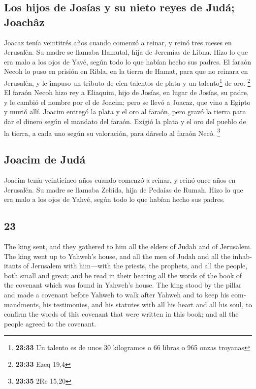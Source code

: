 \begin{paracol}{2}
\hypertarget{los-hijos-de-josuxedas-y-su-nieto-reyes-de-juduxe1-joachuxe2z}{%
\subsection{Los hijos de Josías y su nieto reyes de Judá;
Joachâz}\label{los-hijos-de-josuxedas-y-su-nieto-reyes-de-juduxe1-joachuxe2z}}

 Joacaz tenía veintitrés años cuando comenzó a reinar, y
reinó tres meses en Jerusalén. Su madre se llamaba Hamutal, hija de
Jeremías de Libna.  Hizo lo que era malo a los ojos de
Yavé, según todo lo que habían hecho sus padres.  El
faraón Necoh lo puso en prisión en Ribla, en la tierra de Hamat, para
que no reinara en Jerusalén, y le impuso un tributo de cien talentos de
plata y un talento\footnote{\textbf{23:33} Un talento es de unos 30
  kilogramos o 66 libras o 965 onzas troyanas} de oro. \footnote{\textbf{23:33}
  Ezeq 19,4}  El faraón Necoh hizo rey a Eliaquim, hijo
de Josías, en lugar de Josías, su padre, y le cambió el nombre por el de
Joacim; pero se llevó a Joacaz, que vino a Egipto y murió allí.
 Joacim entregó la plata y el oro al faraón, pero gravó
la tierra para dar el dinero según el mandato del faraón. Exigió la
plata y el oro del pueblo de la tierra, a cada uno según su valoración,
para dárselo al faraón Necó. \footnote{\textbf{23:35} 2Re 15,20}

\hypertarget{joacim-de-juduxe1}{%
\subsection{Joacim de Judá}\label{joacim-de-juduxe1}}

 Joacim tenía veinticinco años cuando comenzó a reinar, y
reinó once años en Jerusalén. Su madre se llamaba Zebida, hija de
Pedaías de Rumah.  Hizo lo que era malo a los ojos de
Yahvé, según todo lo que habían hecho sus padres.

\switchcolumn
\begin{otherlanguage}{english}

\hypertarget{section-45}{%
\section{23}\label{section-45}}

 The king sent, and they gathered to him all the elders of
Judah and of Jerusalem.  The king went up to Yahweh's
house, and all the men of Judah and all the inhabitants of Jerusalem
with him---with the priests, the prophets, and all the people, both
small and great; and he read in their hearing all the words of the book
of the covenant which was found in Yahweh's house.  The
king stood by the pillar and made a covenant before Yahweh to walk after
Yahweh and to keep his commandments, his testimonies, and his statutes
with all his heart and all his soul, to confirm the words of this
covenant that were written in this book; and all the people agreed to
the covenant.


\end{otherlanguage}
\end{paracol}
